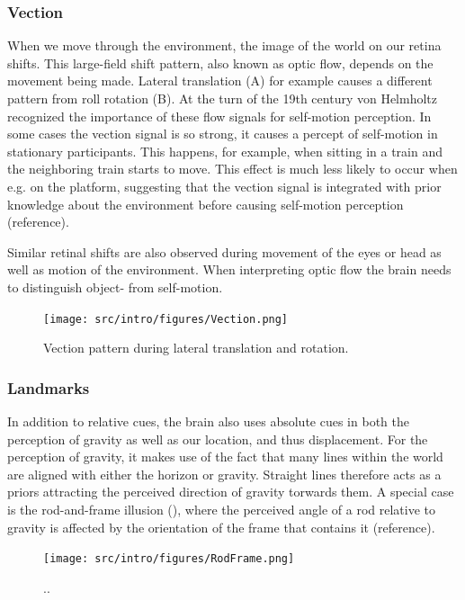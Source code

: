 \subsubsection{Vection}
When we move through the environment, the image of the world on our retina shifts. This large-field shift pattern, also known as optic flow, depends on the movement being made. Lateral translation (A) for example causes a different pattern from roll rotation (B). At the turn of the 19th century von Helmholtz \citeyear{vonhelmholtz1867} recognized the importance of these flow signals for self-motion perception. In some cases the vection signal is so strong, it causes a percept of self-motion in stationary participants. This happens, for example, when sitting in a train and the neighboring train starts to move. This effect is much less likely to occur when e.g. on the platform, suggesting that the vection signal is integrated with prior knowledge about the environment before causing self-motion perception (reference).

Similar retinal shifts are also observed during movement of the eyes or head as well as motion of the environment. When interpreting optic flow the brain needs to distinguish object- from self-motion.



\begin{figure}
    \texttt{[image: src/intro/figures/Vection.png]}

    \caption{Vection pattern during  lateral translation and  rotation.}
    \label{intro:fig2}
\end{figure}

\subsubsection{Landmarks}
In addition to relative cues, the brain also uses absolute cues in both the perception of gravity as well as our location, and thus displacement. For the perception of gravity, it makes use of the fact that many lines within the world are aligned with either the horizon or gravity. Straight lines therefore acts as a priors attracting the perceived direction of gravity torwards them. A special case is the rod-and-frame illusion (), where the perceived angle of a rod relative to gravity is affected by the orientation of the frame that contains it (reference).

\begin{figure}
	\texttt{[image: src/intro/figures/RodFrame.png]}
	\caption{..}
	\label{intro:fig9}
\end{figure}

